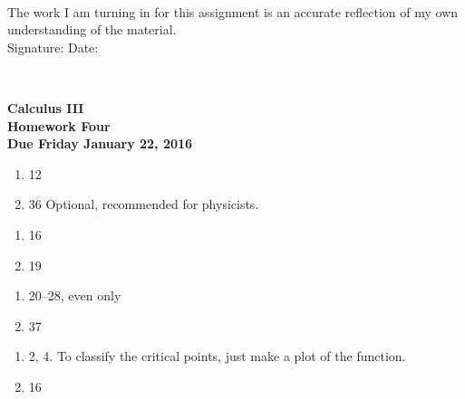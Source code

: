 \documentclass[12pt]{article}
\begin{document}
\\

\bigskip
\bigskip
\bigskip
\bigskip
\bigskip
\bigskip
\noindent The work I am turning in for this assignment is an accurate
reflection of my own understanding of the material.\\[14pt]

\noindent Signature: \underline{\hspace{7cm}} \hspace{1cm} Date:
\underline{\hspace{5cm}} 


\hspace{2mm}\\
\newpage

 
\begin{center}
{\large {\bf Calculus III}}\\
\medskip
{\large {\bf Homework Four}}\\
\medskip
{ {\bf Due Friday January 22, 2016}}\\
\end{center}




\begin{enumerate}
\setlength{\itemsep}{-1mm}
  \item 12
  \item 36 Optional, recommended for physicists.
\end{enumerate}


\begin{enumerate}
\setlength{\itemsep}{-1mm}
  \item 16
  \item 19
\end{enumerate}


\begin{enumerate}
\setlength{\itemsep}{-1mm}
  \item 20--28, even only
  \item 37
\end{enumerate}

\begin{enumerate}
\setlength{\itemsep}{-1mm}
  \item 2, 4.  To classify the critical points, just make a plot of
    the function. 
  \item 16
\end{enumerate}
\end{document}

